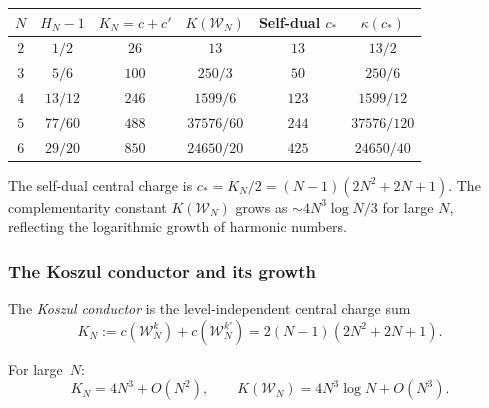 \begin{computation}
\label{comp:thqg-IV-w-small-N}
\renewcommand{\arraystretch}{1.4}
\begin{center}
\begin{tabular}{cccccc}
\toprule
$N$ & $H_N - 1$ & $K_N = c + c'$ & $K(\mathcal{W}_N)$ &
Self-dual $c_*$ & $\kappa(c_*)$ \\
\midrule
$2$ & $1/2$ & $26$ & $13$ & $13$ & $13/2$ \\[4pt]
$3$ & $5/6$ & $100$ & $250/3$ & $50$ & $250/6$ \\[4pt]
$4$ & $13/12$ & $246$ & $1599/6$ & $123$ & $1599/12$ \\[4pt]
$5$ & $77/60$ & $488$ & $37576/60$ & $244$ & $37576/120$ \\[4pt]
$6$ & $29/20$ & $850$ & $24650/20$ & $425$ & $24650/40$ \\
\bottomrule
\end{tabular}
\end{center}
The self-dual central charge is $c_* = K_N/2 = (N-1)(2N^2+2N+1)$.
The complementarity constant $K(\mathcal{W}_N)$ grows as
$\sim 4N^3 \log N / 3$ for large $N$, reflecting the logarithmic
growth of harmonic numbers.
\end{computation}

\subsubsection{The Koszul conductor and its growth}

\begin{definition}
\label{def:thqg-IV-koszul-conductor}
The \emph{Koszul conductor} is the level-independent central charge sum
\begin{equation}\label{eq:thqg-IV-koszul-conductor}
K_N := c(\mathcal{W}_N^k) + c(\mathcal{W}_N^{k'})
= 2(N-1)(2N^2 + 2N + 1).
\end{equation}
\end{definition}

\begin{proposition}
\label{prop:thqg-IV-conductor-growth}
For large~$N$:
\begin{equation}\label{eq:thqg-IV-conductor-growth}
K_N = 4N^3 + O(N^2),
\qquad
K(\mathcal{W}_N) = 4N^3 \log N + O(N^3).
\end{equation}
\end{proposition}


